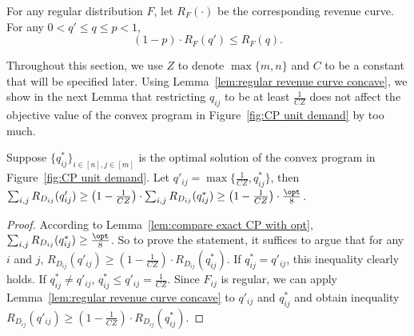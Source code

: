 \begin{lemma}\cite{CaiD11b}\label{lem:regular revenue curve concave}
	For any regular distribution $F$, let $R_F(\cdot)$ be the corresponding revenue curve. For any $0<q'\leq q\leq  p < 1$, $$(1-p)\cdot R_F(q')\leq  R_F(q).$$
	\end{lemma}
 Throughout this section, we use $Z$ to denote $\max\{m,n\}$ and $C$ to be a constant that will be specified later. Using Lemma~\ref{lem:regular revenue curve concave}, we show in the next Lemma that restricting $q_{ij}$ to be at least $\frac{1}{ CZ}$ does not affect the objective value of the convex program in Figure~\ref{fig:CP unit demand} by too much.

\begin{lemma}\label{lem:lowering high prices}
	Suppose $\{q_{ij}^*\}_{i\in[n], j\in[m]}$ is the optimal solution of the convex program in Figure~\ref{fig:CP unit demand}. Let $q'_{ij}=\max\{\frac{1}{CZ}, q^*_{ij}\}$, then $\sum_{i,j} R_{D_{ij}}(q'_{ij})\geq \left(1-\frac{1}{ CZ}\right)\cdot \sum_{i,j} R_{D_{ij}}(q^*_{ij})\geq \left(1-\frac{1}{ CZ}\right)\cdot \frac{\opt}{8}$.
\end{lemma}
\begin{proof}
	According to Lemma~\ref{lem:compare exact CP with opt}, $\sum_{i,j} R_{D_{ij}}(q^*_{ij})\geq \frac{\opt}{8}$. So to prove the statement, it suffices to argue that for any $i$ and $j$, $R_{D_{ij}}(q'_{ij})\geq \left(1-\frac{1}{CZ}\right)\cdot R_{D_{ij}}(q^*_{ij})$. If $q^*_{ij} = q'_{ij}$, this inequality clearly holds. If $q^*_{ij} \neq q'_{ij}$, $q^*_{ij}\leq q'_{ij}=\frac{1}{CZ}$. Since $F_{ij}$ is regular, we can apply Lemma~\ref{lem:regular revenue curve concave} to $q'_{ij}$ and $q^*_{ij}$ and obtain inequality $R_{D_{ij}}(q'_{ij})\geq \left(1-\frac{1}{C Z}\right)\cdot R_{D_{ij}}(q^*_{ij})$.
\end{proof}


